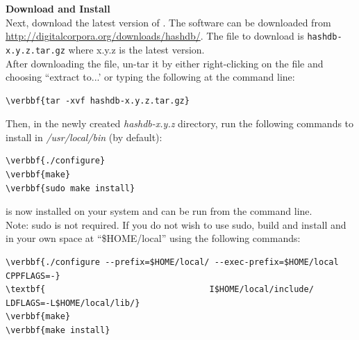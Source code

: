 \documentclass[11pt,fleqn]{article} %
\begin{document}
\textbf{Download and Install \hdb}\\
Next, download the latest version of \hdb. The software can be downloaded from \url{http://digitalcorpora.org/downloads/hashdb/}. The file to download is \texttt{hashdb-x.y.z.tar.gz} where x.y.z is the latest version.\\

After downloading the file, un-tar it by either right-clicking on the file and choosing ``extract to...' or typing the following at the command line:
\begin{Verbatim}[commandchars=\\\{\}]
\verbbf{tar -xvf hashdb-x.y.z.tar.gz}
\end{Verbatim}

Then, in the newly created \textit{hashdb-x.y.z} directory, run the following commands to install \hdb in \textit{/usr/local/bin} (by default):

\begin{Verbatim}[commandchars=\\\{\}]
\verbbf{./configure}
\verbbf{make}
\verbbf{sudo make install}
\end{Verbatim}
\hdb is now installed on your system and can be run from the command line. \\

Note: sudo is not required. If you do not wish to use sudo,  build and install \hdb and \bulk in your own space at ``\$HOME/local'' using the following commands:
\begin{Verbatim}[commandchars=\\\{\}]
\verbbf{./configure --prefix=$HOME/local/ --exec-prefix=$HOME/local CPPFLAGS=-}
\textbf{                                 I$HOME/local/include/ LDFLAGS=-L$HOME/local/lib/}
\verbbf{make}
\verbbf{make install}
\end{Verbatim}
\end{document}
